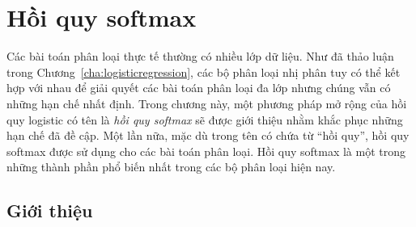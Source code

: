 \chapter{Hồi quy softmax}
\label{cha:softmax}
Các bài toán phân loại thực tế thường có nhiều lớp dữ liệu. Như đã thảo luận
trong Chương~\ref{cha:logisticregression}, các bộ phân loại nhị phân tuy có thể
kết hợp với nhau để giải quyết các bài toán phân loại đa lớp nhưng chúng vẫn có
những hạn chế nhất định. Trong chương này, một phương pháp mở rộng của hồi quy
logistic có tên là \textit{hồi quy softmax} sẽ được giới thiệu nhằm khắc phục
những hạn chế đã đề cập. Một lần nữa, mặc dù trong tên có chứa từ ``hồi quy'',
hồi quy softmax được sử dụng cho các bài toán phân loại. Hồi quy softmax là một
trong những thành phần phổ biến nhất trong các bộ phân loại hiện nay.







\section{Giới thiệu }

